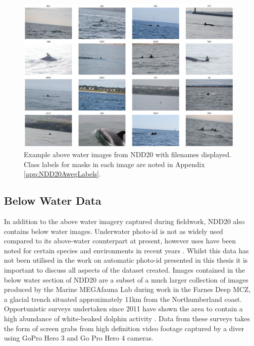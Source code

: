 \begin{figure}
	\begin{center}
		\includegraphics[scale=0.3]{Chapter4/figs/aweg-tiled.png}
	\end{center}
	\caption[Example above water images from NDD20 with filenames displayed.]{Example above water images from NDD20 with filenames displayed. Class labels for masks in each image are noted in Appendix \ref{app:NDD20AwegLabels}.}
	\label{fig:above-water-example}
\end{figure}

\subsection{Below Water Data}\label{ch:NDD,sec:NDD20,sub:belowWaterData}

In addition to the above water imagery captured during fieldwork, NDD20 also contains below water images. Underwater photo-id is not as widely used compared to its above-water counterpart at present, however uses have been noted for certain species and environments in recent years \cite{van_bressem_visual_2018, veronique_underwater_2022}. Whilst this data has not been utilised in the work on automatic photo-id presented in this thesis it is important to discuss all aspects of the dataset created. Images contained in the below water section of NDD20 are a subset of a much larger collection of images produced by the Marine MEGAfauna Lab during work in the Farnes Deep MCZ, a glacial trench situated approximately 11km from the Northumberland coast. Opportunistic surveys undertaken since 2011 have shown the area to contain a high abundance of white-beaked dolphin activity \cite{van_bressem_visual_2018}. Data from these surveys takes the form of screen grabs from high definition video footage captured by a diver using GoPro Hero 3 and Go Pro Hero 4 cameras. 

